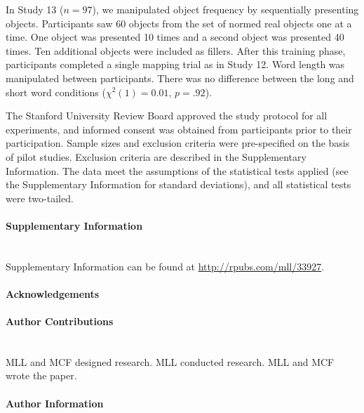 \documentclass[12pt]{article}
\renewcommand\refname{References and Notes}
\newcounter{lastnote}
\begin{document}
In Study 13 ($n = 97$), we manipulated object frequency by sequentially presenting objects. Participants saw 60 objects from the set of normed real objects one at a time. One object was presented 10 times and a second object was presented 40 times. Ten additional objects were included as fillers. After this training phase, participants completed a single mapping trial as in Study 12. Word length was manipulated between participants. There was no difference between the long and short word conditions ($\chi ^2(1) = 0.01$, $p = .92$).

The Stanford University Review Board approved the study protocol for all experiments, and informed consent was obtained from participants prior to their participation. Sample sizes and exclusion criteria were pre-specified on the basis of pilot studies. Exclusion criteria are described in the Supplementary Information. The data meet the assumptions of the statistical tests applied (see the Supplementary Information for standard deviations), and all statistical tests were two-tailed.

\renewcommand{\refname}{\normalsize References}



\paragraph*{Supplementary Information}\mbox{}\\
Supplementary Information can be found at \url{http://rpubs.com/mll/33927}.

\paragraph*{Acknowledgements}

\paragraph*{Author Contributions} \mbox{}\\
MLL and MCF designed research. MLL conducted research. MLL and MCF wrote the paper. 

\paragraph*{Author Information}


\end{document}
